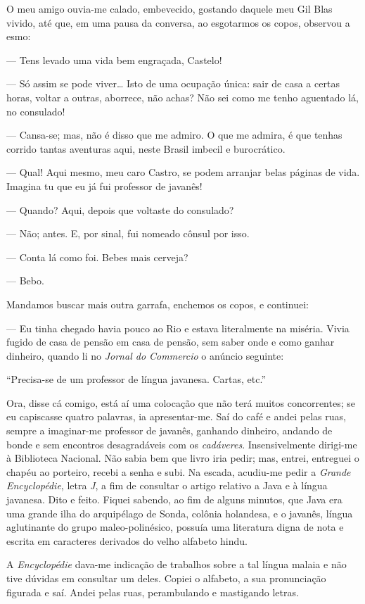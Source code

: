 O meu amigo ouvia-me calado, embevecido, gostando daquele meu Gil Blas
vivido, até que, em uma pausa da conversa, ao esgotarmos os copos,
observou a esmo:

--- Tens levado uma vida bem engraçada, Castelo!

--- Só assim se pode viver\ldots{} Isto de uma ocupação única: sair de
casa a certas horas, voltar a outras, aborrece, não achas? Não sei como
me tenho aguentado lá, no consulado!

--- Cansa-se; mas, não é disso que me admiro. O que me admira, é que
tenhas corrido tantas aventuras aqui, neste Brasil imbecil e
burocrático.

--- Qual! Aqui mesmo, meu caro Castro, se podem arranjar belas páginas
de vida. Imagina tu que eu já fui professor de javanês!

--- Quando? Aqui, depois que voltaste do consulado?

--- Não; antes. E, por sinal, fui nomeado cônsul por isso.

--- Conta lá como foi. Bebes mais cerveja?

--- Bebo.

Mandamos buscar mais outra garrafa, enchemos os copos, e continuei:

--- Eu tinha chegado havia pouco ao Rio e estava literalmente na
miséria. Vivia fugido de casa de pensão em casa de pensão, sem saber
onde e como ganhar dinheiro, quando li no \emph{Jornal do Commercio} o
anúncio seguinte:

``Precisa-se de um professor de língua javanesa. Cartas, etc.''

Ora, disse cá comigo, está aí uma colocação que não terá muitos
concorrentes; se eu capiscasse quatro palavras, ia apresentar-me. Saí do
café e andei pelas ruas, sempre a imaginar-me professor de javanês,
ganhando dinheiro, andando de bonde e sem encontros desagradáveis com os
\emph{cadáveres}. Insensivelmente dirigi-me à Biblioteca Nacional. Não
sabia bem que livro iria pedir; mas, entrei, entreguei o chapéu ao
porteiro, recebi a senha e subi. Na escada, acudiu-me pedir a
\emph{Grande Encyclopédie}, letra \emph{J}, a fim de consultar o artigo
relativo a Java e à língua javanesa. Dito e feito. Fiquei sabendo, ao
fim de alguns minutos, que Java era uma grande ilha do arquipélago de
Sonda, colônia holandesa, e o javanês, língua aglutinante do grupo
maleo-polinésico, possuía uma literatura digna de nota e escrita em
caracteres derivados do velho alfabeto hindu.

A \emph{Encyclopédie} dava-me indicação de trabalhos sobre a tal língua
malaia e não tive dúvidas em consultar um deles. Copiei o alfabeto, a
sua pronunciação figurada e saí. Andei pelas ruas, perambulando e
mastigando letras.

